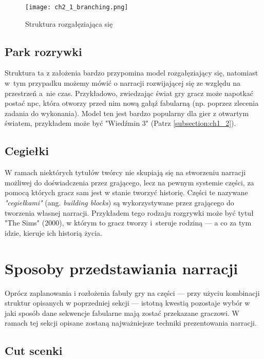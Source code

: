 \begin{figure}[h]
    \texttt{[image: ch2\_1\_branching.png]}
    \caption{Struktura rozgałęziająca się}
    \centering
    \label{fig:ch1_2_1_branching}
\end{figure}

\newpage

\subsection{Park rozrywki}

Struktura ta z założenia bardzo przypomina model rozgałęziający się, natomiast w~tym przypadku
możemy mówić o narracji rozwijającej się ze względu na przestrzeń a~nie czas\cite{theorising_narrative}.
Przykładowo, zwiedzając świat gry gracz może napotkać postać \gls{npc}, która otworzy przed nim nową
gałąź fabularną (np. poprzez zlecenia zadania do wykonania)\cite{the_evolution_of_video_games}.
Model ten jest bardzo popularny dla gier z otwartym światem, przykładem może być "Wiedźmin 3"
(Patrz \ref{subsection:ch1_2}).

\subsection{Cegiełki}

W ramach niektórych tytułów twórcy nie skupiają się na stworzeniu narracji możliwej do doświadczenia
przez grającego, lecz na pewnym systemie części, za pomocą których gracz sam jest w stanie tworzyć
historię. Części te nazywane \textit{"cegiełkami"} (ang. \textit{building blocks})\cite{theorising_narrative}
są wykorzystywane przez grającego do tworzenia własnej narracji. Przykładem tego rodzaju rozgrywki
może być tytuł "The Sims" (2000), w którym to gracz tworzy i~steruje rodziną --- a co za tym idzie,
kieruje ich historią życia.

\section{Sposoby przedstawiania narracji}\label{subsection:ch1_2_2}

Oprócz zaplanowania i rozłożenia fabuły gry na części --- przy użyciu kombinacji struktur opisanych
w poprzedniej sekcji --- istotną kwestią pozostaje wybór w jaki sposób dane sekwencje fabularne
mają zostać przekazane graczowi. W ramach tej sekcji opisane zostaną najważniejsze techniki
prezentowania narracji.

\subsection{Cut scenki}\label{subsubsection:ch1_2_2_cutscene}

